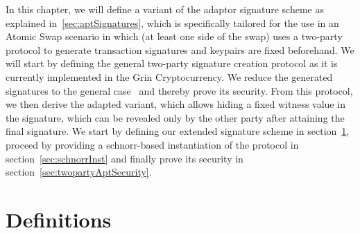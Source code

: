 In this chapter, we will define a variant of the adaptor signature scheme as explained in~\ref{sec:aptSignatures},
which is specifically tailored for the use in an Atomic Swap scenario in which (at least one side of the swap) uses a two-party protocol to generate transaction signatures and keypairs are fixed beforehand. 
We will start by defining the general two-party signature creation protocol as it is currently implemented in the Grin Cryptocurrency.
We reduce the generated signatures to the general case~\cite{schnorr1989efficient} and thereby prove its security. 
From this protocol, we then derive the adapted variant, which allows hiding a fixed witness
value in the signature, which can be revealed only by the other party after attaining the final signature.
We start by defining our extended signature scheme in section~\ref{sec:definitions}, proceed by providing a schnorr-based instantiation of the protocol in section~\ref{sec:schnorrInst} and finally prove its security in section~\ref{sec:twopartyAptSecurity}.

\section{Definitions}\label{sec:definitions}

